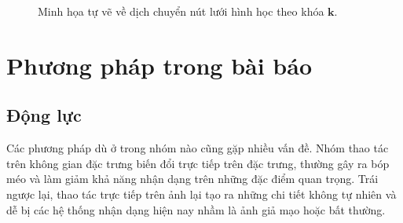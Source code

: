 \documentclass[oneside,a4paper,12pt]{extarticle}
\begin{document}
\begin{figure}[H]
\centering
{}
\caption{Minh họa tự vẽ về dịch chuyển nút lưới hình học theo khóa $\mathbf{k}$.}
\label{fig:grid-morphing}
\end{figure}
\par
\endgroup

\section{Phương pháp trong bài báo}
\label{sec:tc2}

\subsection{Động lực}
\label{sec::dong-luc}
Các phương pháp dù ở trong nhóm nào cũng gặp nhiều vấn đề. Nhóm thao tác trên không gian đặc trưng biến đổi trực tiếp trên đặc trưng, thường gây ra bóp méo và làm giảm khả năng nhận dạng trên những đặc điểm quan trọng. Trái ngược lại, thao tác trực tiếp trên ảnh lại tạo ra những chi tiết không tự nhiên và dễ bị các hệ thống nhận dạng hiện nay nhầm là ảnh giả mạo hoặc bất thường.
\end{document}
